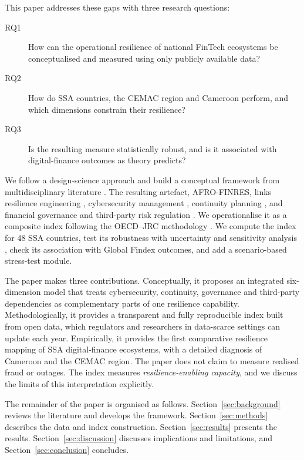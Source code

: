 \documentclass[11pt,a4paper]{article}
\begin{document}
This paper addresses these gaps with three research questions:
\begin{description}
  \item[RQ1] How can the operational resilience of national FinTech ecosystems be conceptualised and measured using only publicly available data?
  \item[RQ2] How do SSA countries, the CEMAC region and Cameroon perform, and which dimensions constrain their resilience?
  \item[RQ3] Is the resulting measure statistically robust, and is it associated with digital-finance outcomes as theory predicts?
\end{description}

We follow a design-science approach \citep{Hevner2004,Peffers2007} and build a conceptual framework from multidisciplinary literature \citep{Jabareen2009}. The resulting artefact, AFRO-FINRES, links resilience engineering \citep{Holling1973,Bruneau2003,Linkov2018}, cybersecurity management \citep{NIST2024}, continuity planning \citep{Swanson2010,ISO22301}, and financial governance and third-party risk regulation \citep{BCBS2021,FSB2023}. We operationalise it as a composite index following the OECD--JRC methodology \citep{OECD2008}. We compute the index for 48 SSA countries, test its robustness with uncertainty and sensitivity analysis \citep{Saisana2005,Greco2018}, check its association with Global Findex outcomes, and add a scenario-based stress-test module.

The paper makes three contributions. Conceptually, it proposes an integrated six-dimension model that treats cybersecurity, continuity, governance and third-party dependencies as complementary parts of one resilience capability. Methodologically, it provides a transparent and fully reproducible index built from open data, which regulators and researchers in data-scarce settings can update each year. Empirically, it provides the first comparative resilience mapping of SSA digital-finance ecosystems, with a detailed diagnosis of Cameroon and the CEMAC region. The paper does not claim to measure realised fraud or outages. The index measures \emph{resilience-enabling capacity}, and we discuss the limits of this interpretation explicitly.

The remainder of the paper is organised as follows. Section~\ref{sec:background} reviews the literature and develops the framework. Section~\ref{sec:methods} describes the data and index construction. Section~\ref{sec:results} presents the results. Section~\ref{sec:discussion} discusses implications and limitations, and Section~\ref{sec:conclusion} concludes.
\end{document}
